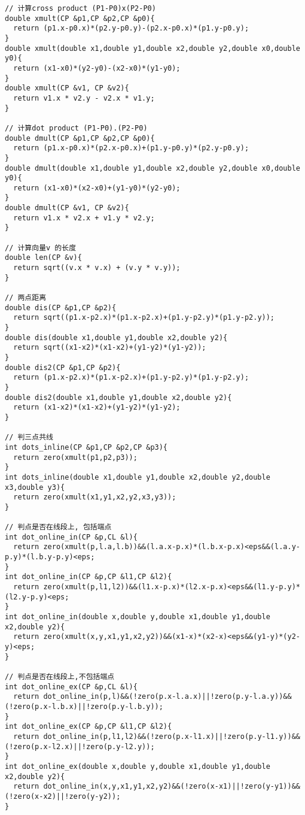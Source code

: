 \begin{lstlisting}[language={}]
// 计算cross product (P1-P0)x(P2-P0)
double xmult(CP &p1,CP &p2,CP &p0){
  return (p1.x-p0.x)*(p2.y-p0.y)-(p2.x-p0.x)*(p1.y-p0.y);
}
double xmult(double x1,double y1,double x2,double y2,double x0,double y0){
  return (x1-x0)*(y2-y0)-(x2-x0)*(y1-y0);
}
double xmult(CP &v1, CP &v2){
  return v1.x * v2.y - v2.x * v1.y;
}

// 计算dot product (P1-P0).(P2-P0)
double dmult(CP &p1,CP &p2,CP &p0){
  return (p1.x-p0.x)*(p2.x-p0.x)+(p1.y-p0.y)*(p2.y-p0.y);
}
double dmult(double x1,double y1,double x2,double y2,double x0,double y0){
  return (x1-x0)*(x2-x0)+(y1-y0)*(y2-y0);
}
double dmult(CP &v1, CP &v2){
  return v1.x * v2.x + v1.y * v2.y;
}

// 计算向量v 的长度
double len(CP &v){
  return sqrt((v.x * v.x) + (v.y * v.y));
}

// 两点距离
double dis(CP &p1,CP &p2){
  return sqrt((p1.x-p2.x)*(p1.x-p2.x)+(p1.y-p2.y)*(p1.y-p2.y));
}
double dis(double x1,double y1,double x2,double y2){
  return sqrt((x1-x2)*(x1-x2)+(y1-y2)*(y1-y2));
}
double dis2(CP &p1,CP &p2){
  return (p1.x-p2.x)*(p1.x-p2.x)+(p1.y-p2.y)*(p1.y-p2.y);
}
double dis2(double x1,double y1,double x2,double y2){
  return (x1-x2)*(x1-x2)+(y1-y2)*(y1-y2);
}

// 判三点共线
int dots_inline(CP &p1,CP &p2,CP &p3){
  return zero(xmult(p1,p2,p3));
}
int dots_inline(double x1,double y1,double x2,double y2,double x3,double y3){
  return zero(xmult(x1,y1,x2,y2,x3,y3));
}

// 判点是否在线段上, 包括端点
int dot_online_in(CP &p,CL &l){
  return zero(xmult(p,l.a,l.b))&&(l.a.x-p.x)*(l.b.x-p.x)<eps&&(l.a.y-p.y)*(l.b.y-p.y)<eps;
}
int dot_online_in(CP &p,CP &l1,CP &l2){
  return zero(xmult(p,l1,l2))&&(l1.x-p.x)*(l2.x-p.x)<eps&&(l1.y-p.y)*(l2.y-p.y)<eps;
}
int dot_online_in(double x,double y,double x1,double y1,double x2,double y2){
  return zero(xmult(x,y,x1,y1,x2,y2))&&(x1-x)*(x2-x)<eps&&(y1-y)*(y2-y)<eps;
}

// 判点是否在线段上,不包括端点
int dot_online_ex(CP &p,CL &l){
  return dot_online_in(p,l)&&(!zero(p.x-l.a.x)||!zero(p.y-l.a.y))&&(!zero(p.x-l.b.x)||!zero(p.y-l.b.y));
}
int dot_online_ex(CP &p,CP &l1,CP &l2){
  return dot_online_in(p,l1,l2)&&(!zero(p.x-l1.x)||!zero(p.y-l1.y))&&(!zero(p.x-l2.x)||!zero(p.y-l2.y));
}
int dot_online_ex(double x,double y,double x1,double y1,double x2,double y2){
  return dot_online_in(x,y,x1,y1,x2,y2)&&(!zero(x-x1)||!zero(y-y1))&&(!zero(x-x2)||!zero(y-y2));
}


\end{lstlisting}
